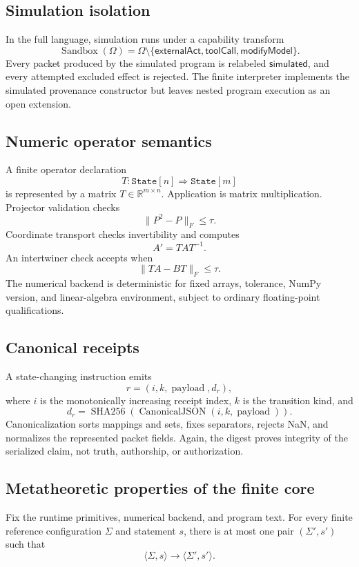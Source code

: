 \subsection{Simulation isolation}

In the full language, simulation runs under a capability transform
\[
\operatorname{Sandbox}(\Omega)
=
\Omega\setminus
\{\mathsf{externalAct},\mathsf{toolCall},\mathsf{modifyModel}\}.
\]
Every packet produced by the simulated program is relabeled
\(\mathsf{simulated}\), and every attempted excluded effect is rejected.  The
finite interpreter implements the simulated provenance constructor but leaves
nested program execution as an open extension.

\subsection{Numeric operator semantics}

A finite operator declaration
\[
T:\texttt{State}[n]\Rightarrow\texttt{State}[m]
\]
is represented by a matrix \(T\in\mathbb R^{m\times n}\).  Application is
matrix multiplication.  Projector validation checks
\[
\|P^2-P\|_F\le\tau.
\]
Coordinate transport checks invertibility and computes
\[
A'=TAT^{-1}.
\]
An intertwiner check accepts when
\[
\|TA-BT\|_F\le\tau.
\]
The numerical backend is deterministic for fixed arrays, tolerance, NumPy
version, and linear-algebra environment, subject to ordinary floating-point
qualifications.

\subsection{Canonical receipts}

A state-changing instruction emits
\[
r=(i,k,\operatorname{payload},d_r),
\]
where \(i\) is the monotonically increasing receipt index, \(k\) is the
transition kind, and
\[
d_r=\operatorname{SHA256}
\left(
\operatorname{CanonicalJSON}(i,k,\operatorname{payload})
\right).
\]
Canonicalization sorts mappings and sets, fixes separators, rejects NaN, and
normalizes the represented packet fields.  Again, the digest proves integrity
of the serialized claim, not truth, authorship, or authorization.

\subsection{Metatheoretic properties of the finite core}

\begin{theorem}
Fix the runtime primitives, numerical backend, and program text.  For every
finite reference configuration \(\Sigma\) and statement \(s\), there is at most
one pair \((\Sigma',s')\) such that
\[
\langle\Sigma,s\rangle
\longrightarrow
\langle\Sigma',s'\rangle.
\]
\end{theorem}

